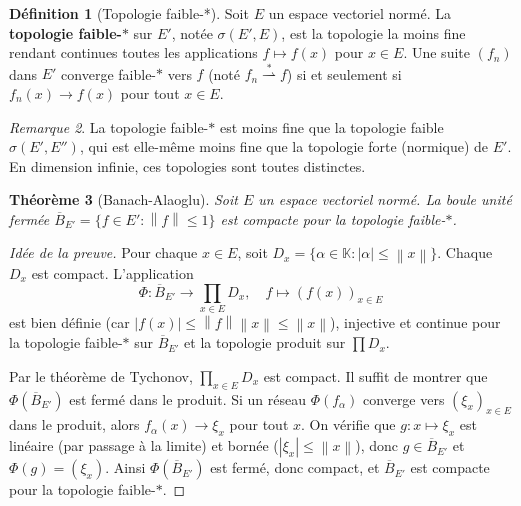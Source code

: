 \documentclass[a4paper,12pt]{book}
\newcommand{\K}{\mathbb{K}}
\newcommand{\norm}[1]{\left\| #1 \right\|}
\newcommand{\abs}[1]{\left| #1 \right|}
\newcommand{\weakstarto}{\overset{*}{\rightharpoonup}}
\theoremstyle{definition}
\newtheorem{definition}{Définition}[chapter]
\theoremstyle{plain}
\newtheorem{theoreme}[definition]{Théorème}
\theoremstyle{remark}
\newtheorem{remarque}[definition]{Remarque}
\begin{document}
\begin{definition}[Topologie faible-*]\label{def:topologie-faible-etoile}
Soit $E$ un espace vectoriel normé. La \textbf{topologie faible-$*$} sur $E'$,
notée $\sigma(E', E)$, est la topologie la moins
fine rendant continues toutes les applications $f \mapsto f(x)$ pour $x \in E$.
Une suite $(f_n)$ dans $E'$ converge faible-$*$ vers $f$ (noté $f_n \weakstarto f$)
si et seulement si $f_n(x) \to f(x)$ pour tout $x \in E$.
\end{definition}

\begin{remarque}\label{rem:faible-etoile-moins-fine}
La topologie faible-$*$ est moins fine que la topologie faible $\sigma(E', E'')$, qui
est elle-même moins fine que la topologie forte (normique) de $E'$.
En dimension infinie, ces topologies sont toutes distinctes.
\end{remarque}

\begin{theoreme}[Banach-Alaoglu]\label{thm:banach-alaoglu}
Soit $E$ un espace vectoriel normé. La boule unité fermée
$\overline{B}_{E'} = \{f \in E' : \norm{f} \leq 1\}$
est compacte pour la topologie faible-$*$.
\end{theoreme}

\begin{proof}[Idée de la preuve]
Pour chaque $x \in E$, soit $D_x = \{\alpha \in \K : \abs{\alpha} \leq \norm{x}\}$.
Chaque $D_x$ est compact. L'application
\[
    \Phi : \overline{B}_{E'} \to \prod_{x \in E} D_x, \quad f \mapsto (f(x))_{x \in E}
\]
est bien définie (car $\abs{f(x)} \leq \norm{f}\norm{x} \leq \norm{x}$), injective et
continue pour la topologie faible-$*$ sur $\overline{B}_{E'}$ et la topologie produit
sur $\prod D_x$.

Par le théorème de Tychonov, $\prod_{x \in E} D_x$ est
compact. Il suffit de montrer que $\Phi(\overline{B}_{E'})$ est fermé dans le produit.
Si un réseau $\Phi(f_\alpha)$ converge vers $(\xi_x)_{x \in E}$ dans le produit, alors
$f_\alpha(x) \to \xi_x$ pour tout $x$. On vérifie que $g : x \mapsto \xi_x$ est
linéaire (par passage à la limite) et bornée ($\abs{\xi_x} \leq \norm{x}$), donc
$g \in \overline{B}_{E'}$ et $\Phi(g) = (\xi_x)$. Ainsi $\Phi(\overline{B}_{E'})$ est
fermé, donc compact, et $\overline{B}_{E'}$ est compacte pour la topologie faible-$*$.
\end{proof}
\end{document}

